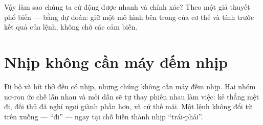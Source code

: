 Vậy làm sao chúng ta cử động được nhanh và chính xác? Theo một giả thuyết phổ biến --- bằng dự đoán: giữ một mô hình bên trong của cơ thể và tính trước kết quả của lệnh, không chờ các cảm biến.

\section*{Nhịp không cần máy đếm nhịp}

Đi bộ và hít thở đều có nhịp, nhưng chúng không cần máy đếm nhịp. Hai nhóm nơ-ron ức chế lẫn nhau và mỏi dần sẽ tự thay phiên nhau làm việc: kẻ thắng mệt đi, đối thủ đã nghỉ ngơi giành phần hơn, và cứ thế mãi. Một lệnh không đổi từ trên xuống --- ``đi'' --- ngay tại chỗ biến thành nhịp ``trái-phải''.

